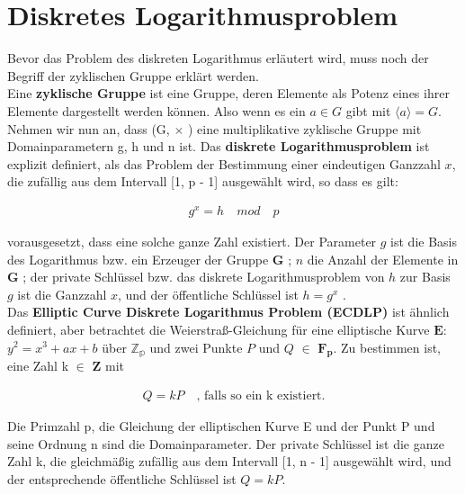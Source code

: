 \section{Diskretes Logarithmusproblem }

Bevor das Problem des diskreten Logarithmus erläutert wird, muss noch der Begriff der zyklischen Gruppe erklärt werden.\\ 

Eine \textbf{zyklische Gruppe} ist eine Gruppe, deren Elemente
als Potenz eines ihrer Elemente dargestellt werden können. Also wenn es ein \(a \in \textit{G}\) gibt mit \(\langle a \rangle = G\).\\ 

Nehmen wir nun an, dass (G, $ \times $ ) eine multiplikative zyklische Gruppe mit Domainparametern g, h und n ist.   
Das \textbf{diskrete Logarithmusproblem} ist explizit definiert, als das Problem der Bestimmung einer eindeutigen Ganzzahl $ x $, die zufällig aus dem Intervall [1, p - 1] ausgewählt wird, so dass es gilt:
\begin{ceqn}

\begin{align*}
                g^x = h \quad mod \quad p
\end{align*}

\end{ceqn}
vorausgesetzt, dass eine solche ganze Zahl existiert.
Der Parameter $ g $ ist die Basis des Logarithmus bzw. ein Erzeuger der Gruppe $ \mathbf{G} $ ; $ n $ die Anzahl der Elemente in $ \mathbf{G} $ ; der private Schlüssel bzw. das diskrete Logarithmusproblem von $ h $ zur Basis $ g $  ist die Ganzzahl $ x $, und der öffentliche Schlüssel ist   $ h = g^x $ \cite{Hankerson}. \\


Das \textbf{Elliptic Curve Diskrete Logarithmus Problem (ECDLP)} ist ähnlich definiert, aber betrachtet die Weierstraß-Gleichung für eine elliptische Kurve $ \mathbf{E:} $ $ y^2 = x^3 + ax + b $ über $ \mathbb{Z_p} $ und zwei Punkte $ P $ und $ Q $ $\in $ $ \mathbf{F_p} $.  Zu bestimmen ist, eine Zahl k $ \in $ $ \mathbf{Z} $ mit

\begin{ceqn}
\begin{align*}
      Q = kP  \quad \text{, falls so ein k existiert.}
\end{align*}
   
\end{ceqn}

Die Primzahl p, die Gleichung der elliptischen Kurve E und der Punkt P und seine Ordnung n sind die Domainparameter. Der private Schlüssel ist die ganze Zahl k, die gleichmäßig zufällig aus dem Intervall [1, n - 1] ausgewählt wird, und der entsprechende öffentliche Schlüssel ist $ Q = kP $.

